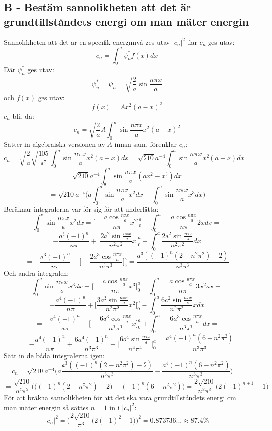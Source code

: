 \documentclass{article}
\begin{document}
      \subsection*{B - Bestäm sannolikheten att det är grundtillståndets energi om man mäter energin}
        Sannolikheten att det är en specifik energinivå ges utav $|c_n|^2$ där $c_n$ ges utav:
        \[
          c_n=\int_0^a\psi_n^*f(x)dx
        \]
        Där $\psi_n^*$ ges utav:
        \[
          \psi_n^*=\psi_n=\sqrt{\frac{2}{a}}\sin{\frac{n\pi x}{a}}
        \]
        och $f(x)$ ges utav:
        \[
          f(x)=Ax^2(a-x)^2
        \]
        $c_n$ blir då:
        \[
          c_n=\sqrt{\frac{2}{a}}A\int_0^a\sin{\frac{n\pi x}{a}}x^2(a-x)^2
        \]
        Sätter in algebraiska versionen av $A$ innan samt förenklar $c_n$:
        \[
          c_n=\sqrt{\frac{2}{a}}\sqrt{\frac{105}{a^7}}\int_0^a\sin{\frac{n\pi x}{a}}x^2(a-x)dx=\sqrt{210}a^{-4}\int_0^a\sin{\frac{n\pi x}{a}}x^2(a-x)dx=
        \]
        \[
          =\sqrt{210}a^{-4}\int_0^a\sin{\frac{n\pi x}{a}}(ax^2-x^3)dx=
        \]
        \[
          =\sqrt{210}a^{-4}\bigg(a\int_0^a\sin{\frac{n\pi x}{a}}x^2dx-\int_0^a\sin{\frac{n\pi x}{a}}x^3dx\bigg)
        \]
        Beräknar integralerna var för sig för att underlätta:
        \[
          \int_0^a\sin{\frac{n\pi x}{a}}x^2dx=\bigg[-\frac{a\cos{\frac{n\pi x}{a}}}{n\pi}x^2\bigg]_0^a-\int_0^a-\frac{a\cos{\frac{n\pi x}{a}}}{n\pi}2xdx=
        \]
        \[
          =-\frac{a^3(-1)^n}{n\pi}+\bigg[\frac{2a^2\sin{\frac{n\pi x}{a}}}{n^2\pi^2}x\bigg]_0^a-\int_0^a\frac{2a^2\sin{\frac{n\pi x}{a}}}{n^2\pi^2}dx=
        \]
        \[
          =-\frac{a^3(-1)^n}{n\pi}-\bigg[-\frac{2a^3\cos{\frac{n\pi x}{a}}}{n^3\pi^3}\bigg]_0^a=\frac{a^3((-1)^n(2-n^2\pi^2)-2)}{n^3\pi^3}
        \]
        Och andra integralen:
        \[
          \int_0^a\sin{\frac{n\pi x}{a}}x^3dx=\bigg[-\frac{a\cos{\frac{n\pi x}{a}}}{n\pi}x^3\bigg]_0^a-\int_0^a-\frac{a\cos{\frac{n\pi x}{a}}}{n\pi}3x^2dx=
        \]
        \[
          =-\frac{a^4(-1)^n}{n\pi}+\bigg[\frac{3a^2\sin{\frac{n\pi x}{a}}}{n^2\pi^2}x^2\bigg]_0^a-\int_0^a\frac{6a^2\sin{\frac{n\pi x}{a}}}{n^2\pi^2}xdx=
        \]
        \[
          =-\frac{a^4(-1)^n}{n\pi}-\bigg[-\frac{6a^3\cos{\frac{n\pi x}{a}}}{n^3\pi^3}x\bigg]_0^a+\int_0^a-\frac{6a^3\cos{\frac{n\pi x}{a}}}{n^3\pi^3}dx=
        \]
        \[
          =-\frac{a^4(-1)^n}{n\pi}+\frac{6a^4(-1)^n}{n^3\pi^3}-\bigg[\frac{6a^4\sin{\frac{n\pi x}{a}}}{n^4\pi^4}\bigg]_0^a=\frac{a^4(-1)^n(6-n^2\pi^2)}{n^3\pi^3}
        \]
        Sätt in de båda integralerna igen:
        \[
          c_n=\sqrt{210}a^{-4}\bigg(a\frac{a^3((-1)^n(2-n^2\pi^2)-2)}{n^3\pi^3}-\frac{a^4(-1)^n(6-n^2\pi^2)}{n^3\pi^3}\bigg)=
        \]
        \[
          =\frac{\sqrt{210}}{n^3\pi^3}\bigg(\big((-1)^n(2-n^2\pi^2)-2\big)-(-1)^n(6-n^2\pi^2)\bigg)=\frac{2\sqrt{210}}{n^3\pi^3}\bigg(2(-1)^{n+1}-1\bigg)
        \]
        För att bräkna sannolikheten för att det ska vara grundtillståndets energi om man mäter energin så sättes $n=1$ in i $|c_n|^2$:
        \[
          |c_n|^2=\bigg(\frac{2\sqrt{210}}{\pi^3}\big(2(-1)^{2}-1\big)\bigg)^2=0.873736...\approx\mathbf{87.4\%}
        \]
\end{document}
